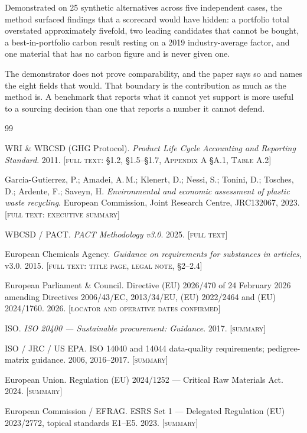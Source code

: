 \documentclass[10pt,twocolumn,a4paper]{article}
\newcommand{\ev}[1]{{\footnotesize\textsc{#1}}}
\begin{document}
Demonstrated on 25 synthetic alternatives across five independent cases, the
method surfaced findings that a scorecard would have hidden: a portfolio total
overstated approximately fivefold, two leading candidates that cannot be bought, a
best-in-portfolio carbon result resting on a 2019 industry-average factor, and one
material that has no carbon figure and is never given one.

The demonstrator does not prove comparability, and the paper says so and names the
eight fields that would. That boundary is the contribution as much as the method
is. A benchmark that reports what it cannot yet support is more useful to a
sourcing decision than one that reports a number it cannot defend.

\begin{thebibliography}{99}\small
\setlength{\itemsep}{1.5pt}

 WRI \& WBCSD (GHG Protocol). \emph{Product Life Cycle Accounting and
Reporting Standard}. 2011. \ev{[full text: \S1.2, \S1.5--\S1.7, Appendix A \S A.1, Table A.2]}

 Garcia-Gutierrez, P.; Amadei, A.\,M.; Klenert, D.; Nessi, S.;
Tonini, D.; Tosches, D.; Ardente, F.; Saveyn, H. \emph{Environmental and economic
assessment of plastic waste recycling}. European Commission, Joint Research
Centre, JRC132067, 2023. \ev{[full text: executive summary]}

 WBCSD / PACT. \emph{PACT Methodology v3.0}. 2025. \ev{[full text]}

 European Chemicals Agency. \emph{Guidance on requirements for
substances in articles}, v3.0. 2015. \ev{[full text: title page, legal note, \S2--2.4]}

 European Parliament \& Council. Directive (EU) 2026/470 of 24
February 2026 amending Directives 2006/43/EC, 2013/34/EU, (EU) 2022/2464 and (EU)
2024/1760. 2026. \ev{[locator and operative dates confirmed]}

 ISO. \emph{ISO 20400 --- Sustainable procurement: Guidance}. 2017. \ev{[summary]}

 ISO / JRC / US EPA. ISO 14040 and 14044 data-quality requirements;
pedigree-matrix guidance. 2006, 2016--2017. \ev{[summary]}

 European Union. Regulation (EU) 2024/1252 --- Critical Raw Materials
Act. 2024. \ev{[summary]}

 European Commission / EFRAG. ESRS Set 1 --- Delegated Regulation
(EU) 2023/2772, topical standards E1--E5. 2023. \ev{[summary]}


\end{thebibliography}
\end{document}
